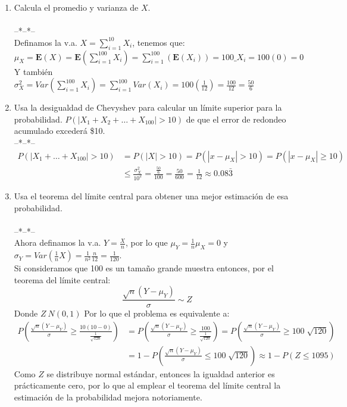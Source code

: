 \documentclass[letter]{memoir} %
\begin{document}
\begin{enumerate}
\begin{enumerate}
\item Calcula el promedio y varianza de $X$.\\\\
--*--*-- \\
Definamos la v.a. $X = \sum_{i=1}^{10}X_i$, tenemos que:\\
$\mu_X = \mathbf{E}(X)= \mathbf{E}\left(\sum_{i=1}^{100}X_i\right) = \sum_{i=1}^{100} \left(\mathbf{E}(X_i)\right)=100\_{X_i} = 100(0)=0  $ \\
Y también \\
$\sigma_{X}^2 = Var(\sum_{i=1}^{100}X_i) =\sum_{i=1}^{100}Var(X_i) = 100(\frac{1}{12}) = \frac{100}{12} = \frac{50}{6} $
\item Usa la desigualdad de Chevyshev para calcular un límite superior para la probabilidad. $P(|X_1+X_2+\dots+X_{100}|>10)$ de que el error de redondeo acumulado excederá \$10.\\
--*--*--\\
\begin{equation*}
\begin{split}
P(|X_1 + \dots +X_{100}| > 10) &= P(|X|>10) = P(|x-\mu_X|>10 ) =P(|x-\mu_X| \geq 10 ) \\
&\leq \frac{\sigma_{X}^2}{10^2} = \frac{\frac{50}{6}}{100} =  \frac{50}{600} = \frac{1}{12}  \approx 0.08\bar{3}    
\end{split}
\end{equation*}

\item Usa el teorema del límite central para obtener una mejor estimación de esa probabilidad.\\\\
--*--*--\\
Ahora definamos la v.a.  $Y = \frac{X}{n}$, por lo que $\mu_Y = \frac{1}{n}\mu_X = 0$ y $\sigma_Y = Var(\frac{1}{n}X)=\frac{1}{n^2}\frac{n}{12} = \frac{1}{120}$. \\
Si consideramos que 100 es un tamaño grande muestra entonces, por el teorema del límite central: \\
\[
	\frac{\sqrt{n}(Y-\mu_Y)}{\sigma} \sim Z
\]
Donde $Z~N(0,1)$
Por lo que el problema es equivalente a:\\
\begin{equation*}
\begin{split}
P\left(	\frac{\sqrt{n}(Y-\mu_Y)}{\sigma} \geq \frac{10(10-0)}{\frac{1}{\sqrt{120}}} \right) &=P\left(	\frac{\sqrt{n}(Y-\mu_Y)}{\sigma} \geq \frac{100}{\frac{1}{\sqrt{120}}} \right) =
P\left(	\frac{\sqrt{n}(Y-\mu_Y)}{\sigma} \geq 100\sqrt[]{120} \right) \\
& = 1 - P\left(	\frac{\sqrt{n}(Y-\mu_Y)}{\sigma} \leq 100\sqrt[]{120} \right) \approx 1 - P(Z \leq 1095) 
\end{split}
\end{equation*}
Como $Z$ se distribuye normal estándar, entonces la igualdad anterior es prácticamente cero, por lo que al emplear el teorema del límite central la estimación de la probabilidad mejora notoriamente.
\end{enumerate}



\end{enumerate}
 
\end{document}
